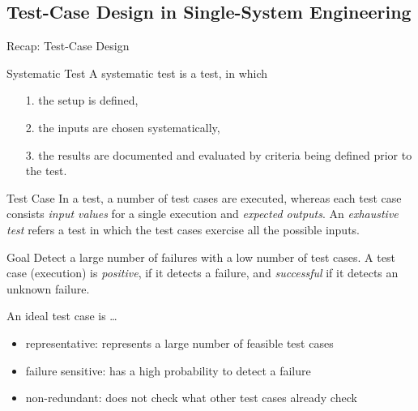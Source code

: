 \subsection{Test-Case Design in Single-System Engineering}
\begin{frame}{Recap: Test-Case Design }
	\begin{mycolumns}
		\begin{definition}{Systematic Test \mysource{\ludewiglichter}}
			A systematic test is a test, in which
			\begin{itemize}
				\setlength\itemsep{.1em}
				\item[1.] the setup is defined,
				\item[2.] the inputs are chosen systematically,
				\item[3.] the results are documented and evaluated by criteria being defined prior to the test. 
			\end{itemize}
		\end{definition}
		\pause
		\begin{definition}{Test Case \mysource{\ludewiglichter}}
			In a test, a number of test cases are executed, whereas each test case consists \emph{input values} for a single execution and \emph{expected outputs}. An \emph{exhaustive test} refers a test in which the test cases exercise all the possible inputs.
		\end{definition}
	\mynextcolumn
		\pause
		\begin{note}{Goal \mysource{\ludewiglichter}}%
			Detect a large number of failures with a low number of test cases. A test case (execution) is \emph{positive}, if it detects a failure, and \emph{successful} if it detects an unknown failure.
		\end{note}
		\pause
		\begin{definition}{An ideal test case is \ldots \mysource{\ludewiglichter}}
			\begin{itemize}
				\setlength\itemsep{.1em}
				\item representative: represents a large number of feasible test cases
				\item failure sensitive: has a high probability to detect a failure
				\item non-redundant: does not check what other test cases already check
			\end{itemize}
		\end{definition}
	\end{mycolumns}
\end{frame}

